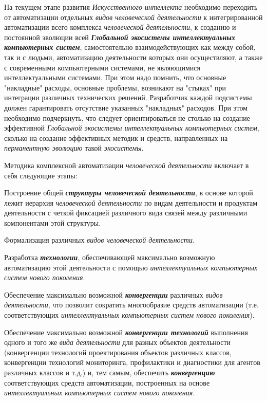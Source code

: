 На текущем этапе развития \textit{Искусственного интеллекта} необходимо переходить от автоматизации отдельных \textit{видов человеческой деятельности} к интегрированной автоматизации всего комплекса \textit{человеческой деятельности}, к созданию и постоянной эволюции всей \textbf{\textit{Глобальной экосистемы интеллектуальных компьютерных систем}}, самостоятельно взаимодействующих как между собой, так и с людьми, автоматизацию деятельности которых они осуществляют, а также с современными компьютерными системами, не являющимися интеллектуальными системами. При этом надо помнить, что основные "накладные"{} расходы, основные проблемы, возникают на "стыках"{} при интеграции различных технических решений. Разработчик каждой подсистемы должен гарантировать отсутствие указанных "накладных"{} расходов. При этом необходимо подчеркнуть, что следует ориентироваться не столько на создание эффективной \textit{Глобальной экосистемы интеллектуальных компьютерных систем}, сколько на создание эффективных методик и средств, направленных на \textit{перманентную эволюцию} такой \textit{экосистемы}.

Методика комплексной автоматизации \textit{человеческой деятельности} включает в себя следующие этапы:

\begin{textitemize}
	\item
	Построение общей \textbf{\textit{структуры человеческой деятельности}}, в основе которой лежит иерархия \textit{человеческой деятельности} по видам деятельности и продуктам деятельности с четкой фиксацией различного вида связей между различными компонентами этой структуры.
	\item
	Формализация различных \textit{видов человеческой деятельности}.
	\item
	Разработка \textbf{\textit{технологии}}, обеспечивающей максимально возможную автоматизацию этой деятельности с помощью \textit{интеллектуальных компьютерных систем нового поколения}.
	\item
	Обеспечение максимально возможной \textbf{\textit{конвергенции}} различных \textit{видов деятельности}, что позволит сократить многообразие средств автоматизации (т.е. соответствующих \textit{интеллектуальных компьютерных систем нового поколения}).
	\item
	Обеспечение максимально возможной \textbf{\textit{конвергенции технологий}} выполнения одного и того же \textit{вида деятельности} для разных объектов деятельности (конвергенции технологий проектирования объектов различных классов, конвергенции технологий мониторинга, профилактики и диагностики для агентов различных классов и т.д.) и, тем самым, обеспечить \textbf{\textit{конвергенцию}} соответствующих средств автоматизации, построенных на основе \textit{интеллектуальных компьютерных систем нового поколения}.
\end{textitemize}

